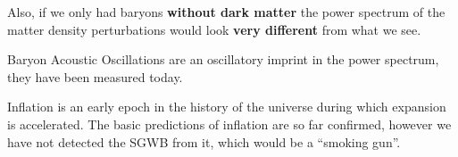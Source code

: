 \documentclass[main.tex]{subfiles}
\begin{document}
Also, if we only had baryons \textbf{without dark matter} the power spectrum of the matter density perturbations would look \textbf{very different} from what we see.

Baryon Acoustic Oscillations are an oscillatory imprint in the power spectrum, they have been measured today.

Inflation is an early epoch in the history of the universe during which expansion is accelerated. 
The basic predictions of inflation are so far confirmed, however we have not detected the SGWB from it, which would be a ``smoking gun''.
\end{document}
